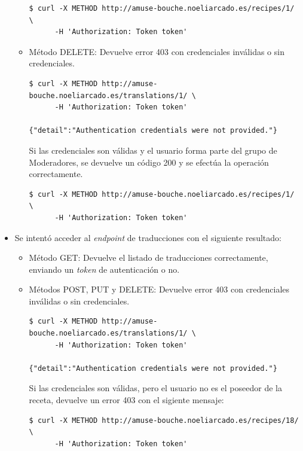 \begin{itemize}
\begin{itemize}
    \begin{verbatim}
$ curl -X METHOD http://amuse-bouche.noeliarcado.es/recipes/1/ \
      -H 'Authorization: Token token'    
    \end{verbatim}

  \item Método DELETE: Devuelve error 403 con credenciales inválidas o sin
    credenciales.

    \begin{verbatim}
$ curl -X METHOD http://amuse-bouche.noeliarcado.es/translations/1/ \
      -H 'Authorization: Token token'

{"detail":"Authentication credentials were not provided."}            
    \end{verbatim}

    Si las credenciales son válidas y el usuario forma parte del grupo de
    Moderadores, se devuelve un código 200 y se efectúa la operación correctamente.

    \begin{verbatim}
$ curl -X METHOD http://amuse-bouche.noeliarcado.es/recipes/1/ \
      -H 'Authorization: Token token'    
    \end{verbatim}
  \end{itemize}

  
\item Se intentó acceder al \textit{endpoint} de traducciones
  con el siguiente resultado:
  
  \begin{itemize}
  \item Método GET: Devuelve el listado de traducciones correctamente, enviando
    un \textit{token} de autenticación o no.

  \item Métodos POST, PUT y DELETE: Devuelve error 403 con credenciales inválidas o sin
    credenciales.

    \begin{verbatim}
$ curl -X METHOD http://amuse-bouche.noeliarcado.es/translations/1/ \
      -H 'Authorization: Token token'

{"detail":"Authentication credentials were not provided."}            
    \end{verbatim}

    Si las credenciales son válidas, pero el usuario no es el poseedor de la
    receta, devuelve un error 403 con el sigiente mensaje:

    \begin{verbatim}
$ curl -X METHOD http://amuse-bouche.noeliarcado.es/recipes/18/ \
      -H 'Authorization: Token token'


\end{verbatim}
\end{itemize}
\end{itemize}
